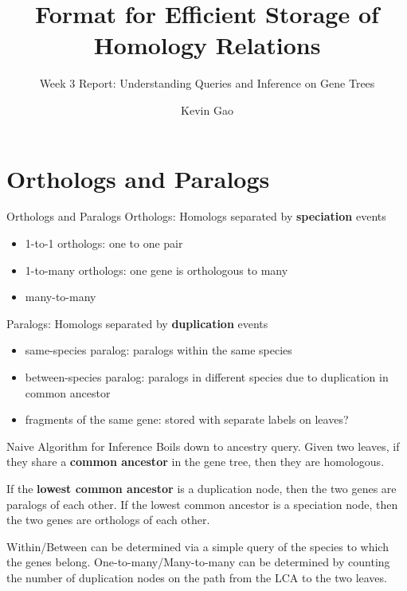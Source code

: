 \documentclass{beamer}
\title{Format for Efficient Storage of Homology Relations}
\subtitle{Week 3 Report: Understanding Queries and Inference on Gene Trees}
\author{Kevin Gao}
\institute{University of Toronto}
\begin{document}
\frame{\titlepage}


\section{Orthologs and Paralogs}

\begin{frame}{Orthologs and Paralogs}
    Orthologs: Homologs separated by \textbf{speciation} events

    \begin{itemize}
        \item 1-to-1 orthologs: one to one pair
        \item 1-to-many orthologs: one gene is orthologous to many
        \item many-to-many
    \end{itemize}

    Paralogs: Homologs separated by \textbf{duplication} events

    \begin{itemize}
        \item same-species paralog: paralogs within the same species
        \item between-species paralog: paralogs in different species due to duplication in common ancestor
        \item fragments of the same gene: stored with separate labels on leaves?
    \end{itemize}
\end{frame}

\begin{frame}{Naive Algorithm for Inference}
    Boils down to ancestry query. Given two leaves, if they share a \textbf{common ancestor} in the gene tree, then they are homologous.

    If the \textbf{lowest common ancestor} is a duplication node, then the two genes are paralogs of each other. If the lowest common ancestor is a speciation node, then the two genes are orthologs of each other.

    Within/Between can be determined via a simple query of the species to which the genes belong. One-to-many/Many-to-many can be determined by counting the number of duplication nodes on the path from the LCA to the two leaves.
\end{frame}
\end{document}
